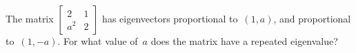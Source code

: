 \begin{activity}
The matrix \(\begin{bmatrix} 2&1\\a^2&2 \end{bmatrix}\) has eigenvectors proportional to~\((1,a)\), and proportional to~\((1,-a)\).
For what value of~\(a\) does the matrix have a repeated eigenvalue?
\end{activity}







